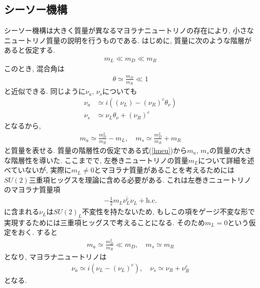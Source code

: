 \subsection{シーソー機構}
シーソー機構は大きく質量が異なるマヨラナニュートリノの存在により, 小さなニュートリノ質量の説明を行うものである.
はじめに, 質量に次のような階層があると仮定する.
\begin{align}
  m_L \ll m_D \ll m_R \label{hneu}
\end{align}
このとき, 混合角は
\begin{align}
  \theta \simeq \frac{m_D}{m_R} \ll 1
\end{align}
と近似できる.
同じように$\nu_a,\,\nu_s$についても
\begin{align}
  \nu_a &\simeq i\left((\nu_L)-(\nu_R)^c\theta_\nu \right)\nonumber\\
  \nu_s &\simeq \nu_L\theta_\nu + (\nu_R)^c\nonumber
\end{align}
となるから,
\begin{align}
  m_a \simeq \frac{m_D^2}{m_R} - m_L,\quad m_s \simeq \frac{m_D^2}{m_R} + m_R\nonumber
\end{align}
と質量を表せる.
質量の階層性の仮定である式(\ref{hneu})から$m_a,\,m_s$の質量の大きな階層性を導いた.
ここまでで, 左巻きニュートリノの質量$m_L$について詳細を述べていないが, 実際に$m_L\neq0$とマヨラナ質量があることを考えるためには$SU(2)$三重項ヒッグスを理論に含める必要がある.
これは左巻きニュートリノのマヨラナ質量項
\begin{align}
  -\frac{1}{2}m_L\overline{\nu_L^c}\nu_L + \mathrm{h.c.} \nonumber
\end{align}
に含まれる$\nu_L$は$SU(2)_L$不変性を持たないため, もしこの項をゲージ不変な形で実現するためには三重項ヒッグスで考えることになる.
そのため$m_L =0$という仮定をおく.
すると
\begin{align}
  m_a \simeq \frac{m_D^2}{m_R}\ll m_D,\quad m_s \simeq m_R\nonumber
\end{align}
となり, マヨラナニュートリノは
\begin{align}
  \nu_a \simeq i\left(\nu_L - (\nu_L)^c\right),\quad \nu_s \simeq \nu_R + \nu_R^c
\end{align}
となる.

